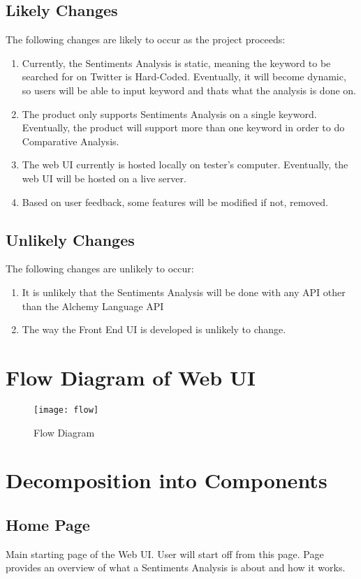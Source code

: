 \documentclass[12pt, titlepage]{article}
\begin{document}
\subsection{Likely Changes}
The following changes are likely to occur as the project proceeds:
\begin{enumerate}[label=AC\arabic*]
  \item Currently, the Sentiments Analysis is static, meaning the keyword to be searched for on Twitter is Hard-Coded. Eventually, it will become dynamic, so users will be able to input keyword and thats what the analysis is done on.
  \item The product only supports Sentiments Analysis on a single keyword. Eventually, the product will support more than one keyword in order to do Comparative Analysis.
  \item The web UI currently is hosted locally on tester's computer. Eventually, the web UI will be hosted on a live server.
  \item Based on user feedback, some features will be modified if not, removed. 
\end{enumerate}

\subsection{Unlikely Changes}
The following changes are unlikely to occur:
\begin{enumerate}[label=UC\arabic*]
  \item It is unlikely that the Sentiments Analysis will be done with any API other than the Alchemy Language API
  \item The way the Front End UI is developed is unlikely to change.
\end{enumerate}

\section{Flow Diagram of Web UI}
\begin{figure}[!htb]
\centering
\texttt{[image: flow]}
\caption{Flow Diagram}
\label{fig:Flow}
\end{figure}

\section{Decomposition into Components}
\subsection{Home Page}
Main starting page of the Web UI. User will start off from this page. Page provides an overview of what a Sentiments Analysis is about and how it works.
\end{document}
